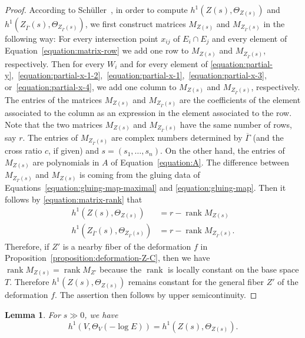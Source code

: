 \documentclass[a4paper, reqno, twoside]{amsart}
\newtheorem{lemma}[theorem]{Lemma}
\theoremstyle{definition}
\numberwithin{equation}{section}
\begin{document}
\begin{proof}
According to Sch\"uller~\cite[Corollary~3.9]{Schuller-2012}, in order
to compute $h^1(Z(s), \Theta_{Z(s)})$ and
$h^1(Z_{\overline{\Gamma}}(s), \Theta_{Z_{\overline{\Gamma}}(s)})$, we
first construct matrices $M_{Z(s)}$ and $M_{Z_{\overline{\Gamma}}(s)}$
in the following way: For every intersection point $x_{ij}$ of $E_i
\cap E_j$ and every element of Equation~\eqref{equation:matrix-row} we
add one row to $M_{Z(s)}$ and $M_{Z_{\overline{\Gamma}}(s)}$,
respectively. Then for every $W_i$ and for every element of
\eqref{equation:partial-y},~\eqref{equation:partial-x-1-2},~\eqref{equation:partial-x-1},~\eqref{equation:partial-x-3},
or~\eqref{equation:partial-x-4}, we add one column to $M_{Z(s)}$ and
$M_{Z_{\overline{\Gamma}}(s)}$, respectively. The entries of the
matrices $M_{Z(s)}$ and $M_{Z_{\overline{\Gamma}}(s)}$ are the
coefficients of the element associated to the column as an expression
in the element associated to the row. Note that the two matrices
$M_{Z(s)}$ and $M_{Z_{\overline{\Gamma}}(s)}$ have the same number of
rows, say $r$. The entries of $M_{Z_{\overline{\Gamma}}(s)}$ are
complex numbers determined by $\overline{\Gamma}$ (and the cross ratio
$c$, if given) and $s=(s_1,\dotsc,s_n)$. On the other hand, the
entries of $M_{Z(s)}$ are polynomials in $A$ of
Equation~\eqref{equation:A}. The difference between
$M_{Z_{\overline{\Gamma}}(s)}$ and $M_{Z(s)}$ is coming from the
gluing data of Equations~\eqref{equation:gluing-map-maximal} and
\eqref{equation:gluing-map}. Then it follows by
\eqref{equation:matrix-rank} that
\begin{align*}
h^1(Z(s), \Theta_{Z(s)}) &= r - \operatorname{rank}{M_{Z(s)}}
\\ h^1(Z_{\overline{\Gamma}}(s), \Theta_{Z_{\overline{\Gamma}}(s)}) &=
r - \operatorname{rank}{M_{Z_{\overline{\Gamma}}(s)}}.
\end{align*}
Therefore, if $Z'$ is a nearby fiber of the deformation $f$ in
Proposition~\ref{proposition:deformation-Z-C}, then we have
$\operatorname{rank}{M_{Z(s)}}=\operatorname{rank}{M_{Z'}}$ because the $\operatorname{rank}$ is locally
constant on the base space $T$. Therefore $h^1(Z(s), \Theta_{Z(s)})$
remains constant for the general fiber $Z'$ of the deformation
$f$. The assertion then follows by upper semicontinuity.
\end{proof}

\begin{lemma}\label{lemma:W<-E>=TZ}
For $s \gg 0$, we have
\begin{equation*}
h^1(V, \Theta_V(-\log{E}))=h^1(Z(s), \Theta_{Z(s)}).
\end{equation*}
\end{lemma}
\end{document}
